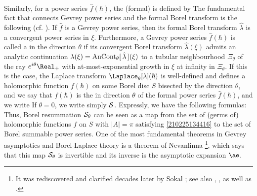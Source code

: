 \documentclass[11pt]{article}
\begin{document}
\begin{appendices}
\paragraph{}
Similarly, for a power series $\hat{f} (\hbar)$, the (formal)  is defined by
The fundamental fact that connects Gevrey power series and the formal Borel transform is the following (cf. \cite[Lemma B.8]{MY2008.06492}).
If $\hat{f}$ is a Gevrey power series, then its formal Borel transform $\hat{\lambda}$ is a convergent power series in $\xi$.
Furthermore, a Gevrey power series $\hat{f} (\hbar)$ is called a  in the direction $\theta$ if its convergent Borel transform $\hat{\lambda} (\xi)$ admits an analytic continuation $\lambda (\xi) = \rm{AnCont}_\theta [\, \hat{\lambda} \,] (\xi)$ to a tubular neighbourhood $\Xi_\theta$ of the ray $e^{i\theta} \Real_+$ with at-most-exponential growth in $\xi$ at infinity in $\Xi_\theta$.
If this is the case, the Laplace transform $\Laplace_\theta [\lambda] (\hbar)$ is well-defined and defines a holomorphic function $f(\hbar)$ on some Borel disc $S$ bisected by the direction $\theta$, and we say that $f(\hbar)$ is the  in direction $\theta$ of the formal power series $\hat{f} (\hbar)$, and we write
If $\theta = 0$, we write simply $\cal{S}$.
Expressly, we have the following formulas:
Thus, Borel resummation $\cal{S}_\theta$ can be seen as a map from the set of (germs of) holomorphic functions $f$ on $S$ with $|A| = \pi$ satisfying \eqref{210225134416} to the set of Borel summable power series.
One of the most fundamental theorems in Gevrey asymptotics and Borel-Laplace theory is a theorem of Nevanlinna \cite[pp.44-45]{nevanlinna1918theorie}\footnote{It was rediscovered and clarified decades later by Sokal \cite{MR558468}; see also \cite[p.182]{zbMATH00797135}, \cite[Theorem 5.3.9]{MR3495546}, as well as \cite[§B.3]{MY2008.06492}.}, which says that this map $\cal{S}_\theta$ is invertible and its inverse is the asymptotic expansion $\ae$.






\end{appendices}
\end{document}
